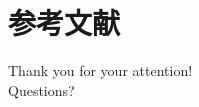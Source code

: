 \documentclass[no-math]{ctexbeamer}
\begin{document}
\section{参考文献}

\nocite{*}

\begin{frame}[allowframebreaks]
    \tiny
    
    
\end{frame}

\begin{frame}
    \begin{center}
        {\huge
            Thank you for your attention!\\
            Questions?
        }
    \end{center}
\end{frame}
\end{document}
